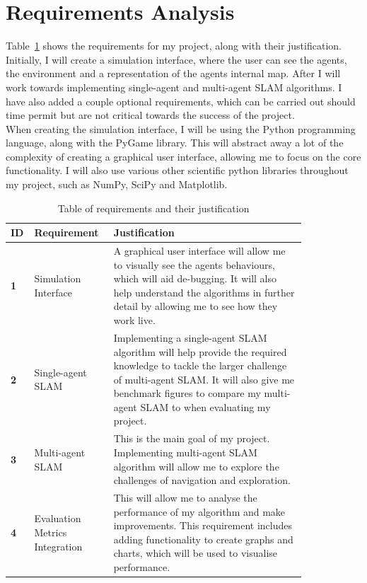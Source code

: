 \documentclass[12pt]{article}
\begin{document}

\section{Requirements Analysis}
Table~\ref{tab:requirements_table} shows the requirements for my project, along with their justification. Initially, I will
create a simulation interface, where the user can see the agents, the environment and a representation of the agents internal
map. After I will work towards implementing single-agent and multi-agent SLAM algorithms. I have also added a couple optional
requirements, which can be carried out should time permit but are not critical towards the success of the project.\\
When creating the simulation interface, I will be using the Python programming language, along with the PyGame library. This
will abstract away a lot of the complexity of creating a graphical user interface, allowing me to focus on the core functionality.
I will also use various other scientific python libraries throughout my project, such as NumPy, SciPy and Matplotlib.\\

\begin{table}[H]
    \centering
    \begin{tabular}{|p{0.03\linewidth}|p{0.2\linewidth}|p{0.6\linewidth}|}
        \hline
        \textbf{ID} &
        \textbf{Requirement} &
        \textbf{Justification}\\
        \hline
        \textbf{1} &
        Simulation Interface &
        A graphical user interface will allow me to visually see the agents behaviours, which will aid de-bugging. It will
        also help understand the algorithms in further detail by allowing me to see how they work live.\\
        \hline
        \textbf{2} &
        Single-agent SLAM &
        Implementing a single-agent SLAM algorithm will help provide the required knowledge to tackle the larger challenge
        of multi-agent SLAM. It will also give me benchmark figures to compare my multi-agent SLAM to when evaluating my project.\\
        \hline
        \textbf{3} &
        Multi-agent SLAM &
        This is the main goal of my project. Implementing multi-agent SLAM algorithm will allow me to explore the challenges of
        navigation and exploration.\\
        \hline
        \textbf{4} &
        Evaluation Metrics Integration &
        This will allow me to analyse the performance of my algorithm and make improvements. This requirement includes adding
        functionality to create graphs and charts, which will be used to visualise performance.\\
        \hline
    \end{tabular}
    \caption{Table of requirements and their justification}\label{tab:requirements_table}
\end{table}\\
\end{document}
